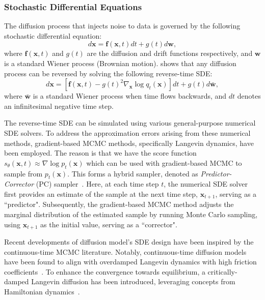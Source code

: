\subsubsection{Stochastic Differential Equations}
The diffusion process that injects noise to data is governed by the following stochastic differential equation:
\begin{equation}
    d\bm{x}=\bm{f}(\bm{x},t)dt+g(t)d\bm{w},
\end{equation}
where $\bm{f}(\bm{x},t)$ and $g(t)$ are the diffusion and drift functions respectively, and $\bm{w}$ is a standard Wiener process (Brownian motion). \citet{anderson1982reverse} shows that any diffusion process can be reversed by solving the following reverse-time SDE:
\begin{equation}
    d\bm{x}=[\bm{f}(\bm{x},t)-g(t)^2\nabla_{\bm{x}}\log q_t(\bm{x})]dt+g(t)d\bar{\bm{w}},
    \label{eq:reverse_time_sde}
\end{equation}
where $\bar{\bm{w}}$ is a standard Wiener process when time flows backwards, and $dt$ denotes an infinitesimal negative time step. 

The reverse-time SDE can be simulated using various general-purpose numerical SDE solvers. To address the approximation errors arising from these numerical methods, gradient-based MCMC methods, specifically Langevin dynamics, have been employed.
The reason is that we
have the score function $s_{\theta}(\bm{x},t) \approx \nabla\log p_t(\bm{x})$ which can be used with gradient-based MCMC to sample from $p_t(\bm{x})$. This forms a hybrid sampler, denoted as \emph{Predictor-Corrector} (PC) sampler~\citep{song2020score}. Here, at each time step $t$, the numerical SDE solver first provides an estimate of the sample at the next time step, $\bm{x}_{t+1}$, serving as a ``predictor". Subsequently, the gradient-based MCMC method adjusts the marginal distribution of the estimated sample by running Monte Carlo sampling, using $\bm{x}_{t+1}$ as the initial value, serving as a ``corrector". 


Recent developments of diffusion model's SDE design have been inspired by the continuous-time MCMC literature. Notably, continuous-time diffusion models have been found to align with overdamped Langevin dynamics with high friction coefficients~\citep{dockhorn2021score}. To enhance the convergence towards equilibrium, a critically-damped Langevin diffusion has been introduced, leveraging concepts from Hamiltonian dynamics~\citep{dockhorn2021score}.



